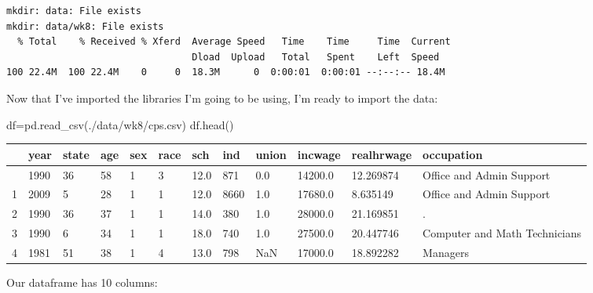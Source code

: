 \documentclass[
  letterpaper,
  DIV=11,
  numbers=noendperiod]{scrreprt}
\newenvironment{Shaded}{\begin{snugshade}}{\end{snugshade}}
\newcommand{\NormalTok}[1]{\textcolor[rgb]{0.00,0.23,0.31}{#1}}
\newcommand{\OperatorTok}[1]{\textcolor[rgb]{0.37,0.37,0.37}{#1}}
\newcommand{\StringTok}[1]{\textcolor[rgb]{0.13,0.47,0.30}{#1}}
\begin{document}
\begin{verbatim}
mkdir: data: File exists
mkdir: data/wk8: File exists
  % Total    % Received % Xferd  Average Speed   Time    Time     Time  Current
                                 Dload  Upload   Total   Spent    Left  Speed
100 22.4M  100 22.4M    0     0  18.3M      0  0:00:01  0:00:01 --:--:-- 18.4M
\end{verbatim}

Now that I've imported the libraries I'm going to be using, I'm ready to
import the data:

\begin{Shaded}
\begin{Highlighting}[]
\NormalTok{df}\OperatorTok{=}\NormalTok{pd.read\_csv(}\StringTok{\textquotesingle{}./data/wk8/cps.csv\textquotesingle{}}\NormalTok{)}
\NormalTok{df.head()}
\end{Highlighting}
\end{Shaded}

\begin{longtable}[]{@{}llllllllllll@{}}
\toprule\noalign{}
& year & state & age & sex & race & sch & ind & union & incwage &
realhrwage & occupation \\
\midrule\noalign{}
\endhead
\bottomrule\noalign{}
\endlastfoot
0 & 1990 & 36 & 58 & 1 & 3 & 12.0 & 871 & 0.0 & 14200.0 & 12.269874 &
Office and Admin Support \\
1 & 2009 & 5 & 28 & 1 & 1 & 12.0 & 8660 & 1.0 & 17680.0 & 8.635149 &
Office and Admin Support \\
2 & 1990 & 36 & 37 & 1 & 1 & 14.0 & 380 & 1.0 & 28000.0 & 21.169851 &
. \\
3 & 1990 & 6 & 34 & 1 & 1 & 18.0 & 740 & 1.0 & 27500.0 & 20.447746 &
Computer and Math Technicians \\
4 & 1981 & 51 & 38 & 1 & 4 & 13.0 & 798 & NaN & 17000.0 & 18.892282 &
Managers \\
\end{longtable}

Our dataframe has 10 columns:
\end{document}
